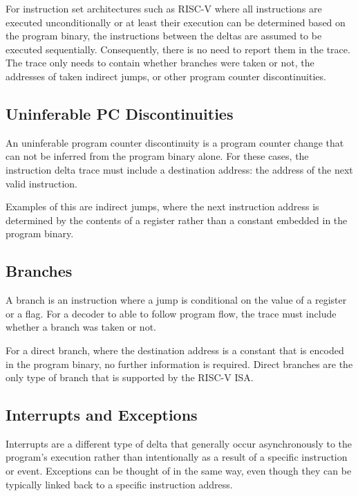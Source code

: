 For instruction set architectures such as RISC-V where all instructions are executed
unconditionally or at least their execution can be determined based on
the program binary, the instructions between the deltas are assumed to be
executed sequentially. Consequently, there is no need
to report them in the trace. The trace only needs to contain whether
branches were taken or not, the addresses of taken indirect jumps, or
other program counter discontinuities.

\subsection{Uninferable PC Discontinuities} \label{uninfpc}

An uninferable program counter discontinuity is a program counter change
that can not be inferred from the program binary alone. For these cases,
the instruction delta trace must include a destination address: the
address of the next valid instruction.

Examples of this are indirect jumps, where
the next instruction address is determined by the contents of a
register rather than a constant embedded in the program binary.

\subsection{Branches} \label{branches}

A branch is an instruction where a jump is conditional on the
value of a register or a flag. For a decoder to able to follow program flow,
the trace must include whether a branch was taken or not.

For a direct branch, where the destination address is a constant that
is encoded in the program binary, no further information is required.
Direct branches are the only type of branch that is supported by the
RISC-V ISA.

\subsection{Interrupts and Exceptions} \label{interruptsexceptions}

Interrupts are a different type of delta that generally occur
asynchronously to the program's execution rather than intentionally as
a result of a specific instruction or event. Exceptions can be thought
of in the same way, even though they can be typically linked back to a
specific instruction address.


